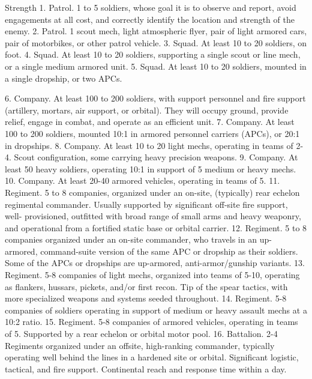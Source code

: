 Strength
    1.  Patrol. 1 to 5 soldiers, whose goal it is to observe and report, avoid engagements at all
        cost, and correctly identify the location and strength of the enemy.
    2.  Patrol. 1 scout mech, light atmospheric flyer, pair of light armored cars, pair of motorbikes,
        or other patrol vehicle.
    3.  Squad. At least 10 to 20 soldiers, on foot.
    4.  Squad. At least 10 to 20 soldiers, supporting a single scout or line mech, or a single
        medium armored unit.
    5.  Squad. At least 10 to 20 soldiers, mounted in a single dropship, or two APCs.




6.  Company. At least 100 to 200 soldiers, with support personnel and fire support (artillery,
    mortars, air support, or orbital). They will occupy ground, provide relief, engage in combat,
    and operate as an efficient unit.
7.  Company. At least 100 to 200 soldiers, mounted 10:1 in armored personnel carriers
    (APCs), or 20:1 in dropships.
8.  Company. At least 10 to 20 light mechs, operating in teams of 2-4. Scout configuration,
    some carrying heavy precision weapons.
9.  Company. At least 50 heavy soldiers, operating 10:1 in support of 5 medium or heavy
    mechs.
10. Company. At least 20-40 armored vehicles, operating in teams of 5.
11. Regiment. 5 to 8 companies, organized under an on-site, (typically) rear echelon
    regimental commander. Usually supported by significant off-site fire support, well-
    provisioned, outfitted with broad range of small arms and heavy weaponry, and operational
    from a fortified static base or orbital carrier.
12. Regiment. 5 to 8 companies organized under an on-site commander, who travels in an up-
    armored, command-suite version of the same APC or dropship as their soldiers. Some of
    the APCs or dropships are up-armored, anti-armor/gunship variants.
13. Regiment. 5-8 companies of light mechs, organized into teams of 5-10, operating as
    flankers, hussars, pickets, and/or first recon. Tip of the spear tactics, with more specialized
    weapons and systems seeded throughout.
14. Regiment. 5-8 companies of soldiers operating in support of medium or heavy assault
    mechs at a 10:2 ratio.
15. Regiment. 5-8 companies of armored vehicles, operating in teams of 5. Supported by a
    rear echelon or orbital motor pool.
16. Battalion. 2-4 Regiments organized under an offsite, high-ranking commander, typically
    operating well behind the lines in a hardened site or orbital. Significant logistic, tactical,
    and fire support. Continental reach and response time within a day.
